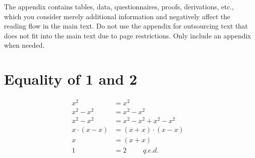 \documentclass[11pt,a4paper]{article}
\begin{document}
\begin{appendix}
	The appendix contains tables, data, questionnaires, proofs, derivations, etc., which you consider merely additional information and negatively affect the reading flow in the main text. Do not use the appendix for outsourcing text that does not fit into the main text due to page restrictions. Only include an appendix when needed.
	\section{Equality of 1 and 2}
	\label{proof:1equal2}
	\begin{align}
	x^2 &= x^2 \\
	x^2 - x^2 &= x^2 - x^2 \\
	x^2 - x^2 &= x^2 - x^2 + x^2 - x^2	\\
	x\cdot\left(x-x\right) &= \left(x+x\right)\cdot\left(x-x\right)	\\
	x &= \left(x+x\right)	\\
	1 &= 2	\hspace{1cm} q.e.d.
	\end{align}

\end{appendix}
\end{document}
